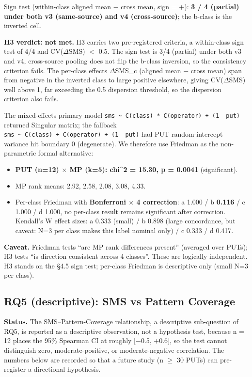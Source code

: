 \documentclass[acmsmall,screen,review]{acmart}
\providecommand{\tightlist}{\setlength{\itemsep}{0pt}\setlength{\parskip}{0pt}}
\begin{document}
Sign test (within-class aligned mean − cross mean, sign = +): \textbf{3
/ 4 (partial) under both v3 (same-source) and v4 (cross-source)}; the
b-class is the inverted cell.

\textbf{H3 verdict: not met.} H3 carries two pre-registered criteria, a
within-class sign test of 4/4 and CV($\Delta$SMS) $<$ 0.5. The sign test
is 3/4 (partial) under both v3 and v4, cross-source pooling does not
flip the b-class inversion, so the consistency criterion fails. The
per-class effects $\Delta$SMS\_c (aligned mean $-$ cross mean) span from
negative in the inverted class to large positive elsewhere, giving
CV($\Delta$SMS) well above 1, far exceeding the 0.5 dispersion threshold,
so the dispersion criterion also fails.

The mixed-effects primary model
\texttt{sms\ \textasciitilde{}\ C(class)\ *\ C(operator)\ +\ (1\ \textbar{}\ put)}
returned Singular matrix; the fallback
\texttt{sms\ \textasciitilde{}\ C(class)\ +\ C(operator)\ +\ (1\ \textbar{}\ put)}
had PUT random-intercept variance hit boundary 0 (degenerate). We
therefore use Friedman as the non-parametric formal alternative:

\begin{itemize}
\tightlist
\item
  \textbf{PUT (n=12) $\times$ MP (k=5): chi\^{}2 = 15.30, p = 0.0041}
  (significant).
\item
  MP rank means: 2.92, 2.58, 2.08, 3.08, 4.33.
\item
  Per-class Friedman with \textbf{Bonferroni $\times$ 4 correction}: a
  1.000 / b \textbf{0.116} / c 1.000 / d 1.000, no per-class
  result remains significant after correction. Kendall's W effect sizes:
  a 0.333 (small) / b 0.898 (large concordance, but caveat: N=3 per
  class makes this label nominal only) / c 0.333 / d 0.417.
\end{itemize}

\textbf{Caveat.} Friedman tests ``are MP rank differences present''
(averaged over PUTs); H3 tests ``is direction consistent across 4
classes''. These are logically independent. H3 stands on the §4.5 sign
test; per-class Friedman is descriptive only (small N=3 per class).

\subsection{RQ5 (descriptive): SMS vs Pattern Coverage}\label{rq4-sms-vs-pattern-coverage}

\textbf{Status.} The SMS--Pattern-Coverage relationship, a descriptive
sub-question of RQ5, is reported as a descriptive observation, not a
hypothesis test, because n = 12 places the 95\% Spearman CI at roughly
{[}−0.5, +0.6{]}, so the test cannot distinguish zero,
moderate-positive, or moderate-negative correlation. The numbers below
are recorded so that a future study (n $\geq$ 30 PUTs) can pre-register a directional
hypothesis.
\end{document}
